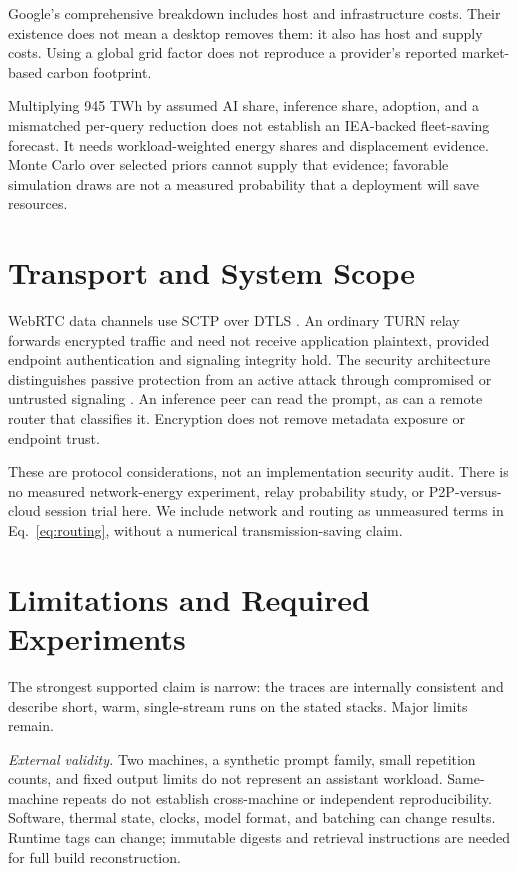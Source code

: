 \documentclass[conference]{IEEEtran}
\begin{document}
Google's comprehensive breakdown includes host and infrastructure costs.
Their existence does not mean a desktop removes them: it also has host
and supply costs. Using a global grid factor does not reproduce a
provider's reported market-based carbon footprint.

Multiplying 945 TWh by assumed AI share, inference share, adoption, and a
mismatched per-query reduction does not establish an IEA-backed
fleet-saving forecast. It needs workload-weighted energy shares and
displacement evidence. Monte Carlo over selected priors cannot supply
that evidence; favorable simulation draws are not a measured probability
that a deployment will save resources.

\section{Transport and System Scope}
WebRTC data channels use SCTP over DTLS \cite{rfc8831}.
An ordinary TURN relay forwards encrypted traffic and need not receive
application plaintext, provided endpoint authentication and signaling
integrity hold. The security architecture distinguishes passive protection
from an active attack through compromised or untrusted signaling
\cite{rfc8827}. An inference peer can read the prompt, as can a remote
router that classifies it. Encryption does not remove metadata exposure
or endpoint trust.

These are protocol considerations, not an implementation security audit.
There is no measured network-energy experiment, relay probability study,
or P2P-versus-cloud session trial here. We include network and routing as
unmeasured terms in Eq.~\eqref{eq:routing}, without a numerical
transmission-saving claim.

\section{Limitations and Required Experiments}
The strongest supported claim is narrow: the traces are internally
consistent and describe short, warm, single-stream runs on the stated
stacks. Major limits remain.

\emph{External validity.} Two machines, a synthetic prompt family, small
repetition counts, and fixed output limits do not represent an assistant
workload. Same-machine repeats do not establish cross-machine or
independent reproducibility. Software, thermal state, clocks, model format,
and batching can change results. Runtime tags can change; immutable
digests and retrieval instructions are needed for full build reconstruction.
\end{document}
